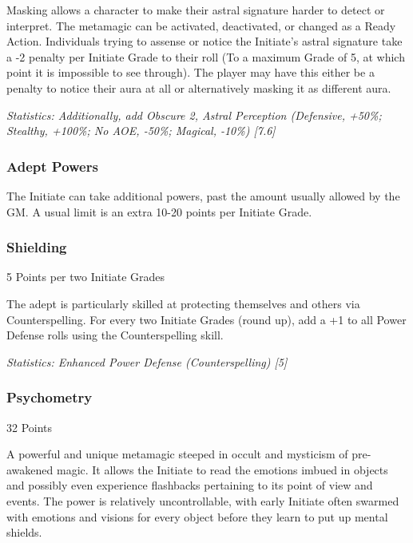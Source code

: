 \begin{multicols*}{3}
	Masking allows a character to make their astral signature harder to detect or interpret. The metamagic can be activated, deactivated, or changed as a Ready Action. Individuals trying to assense or notice the Initiate's astral signature take a -2 penalty per Initiate Grade to their roll (To a maximum Grade of 5,  at which point it is impossible to see through). The player may have this either be a penalty to notice their aura at all or alternatively masking it as different aura.

	\textcolor{OliveGreen}{\textit{Statistics: Additionally, add Obscure 2, Astral Perception (Defensive, +50\%; Stealthy, +100\%; No AOE, -50\%; Magical, -10\%) [7.6] }}
	
	\subsubsection{Adept Powers}
	
	The Initiate can take additional powers, past the amount usually allowed by the GM. A usual limit is an extra 10-20 points per Initiate Grade.
	
	\subsubsection{Shielding}
	\begin{flushright}
		5 Points per two Initiate Grades
	\end{flushright}
	
	The adept is particularly skilled at protecting themselves and others via Counterspelling. For every two Initiate Grades (round up), add a +1 to all Power Defense rolls using the Counterspelling skill.
	
	\textcolor{OliveGreen}{\textit{Statistics: Enhanced Power Defense (Counterspelling) [5] }}
	
	\subsubsection{Psychometry}
	\begin{flushright}
		32 Points
	\end{flushright}
	
	A powerful and unique metamagic steeped in occult and mysticism of pre-awakened magic. It allows the Initiate to read the emotions imbued in objects and possibly even experience flashbacks pertaining to its point of view and events. The power is relatively uncontrollable, with early Initiate often swarmed with emotions and visions for every object before they learn to put up mental shields. 
	

\end{multicols*}
